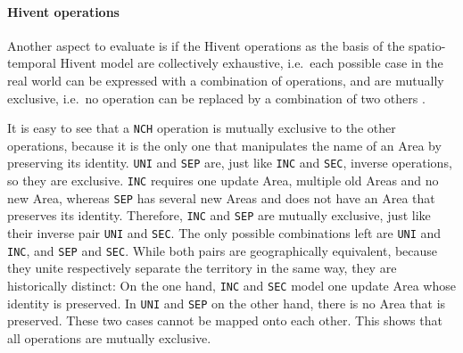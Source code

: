 
\paragraph{Hivent operations} %
\label{par:hivent_operations}

Another aspect to evaluate is if the Hivent operations as the basis of the spatio-temporal Hivent model are collectively exhaustive, i.e.\ each possible case in the real world can be expressed with a combination of operations, and are mutually exclusive, i.e.\ no operation can be replaced by a combination of two others \cite{mece}.

It is easy to see that a \texttt{NCH} operation is mutually exclusive to the other operations, because it is the only one that manipulates the name of an Area by preserving its identity. \texttt{UNI} and \texttt{SEP} are, just like \texttt{INC} and \texttt{SEC}, inverse operations, so they are exclusive. \texttt{INC} requires one update Area, multiple old Areas and no new Area, whereas \texttt{SEP} has several new Areas and does not have an Area that preserves its identity. Therefore, \texttt{INC} and \texttt{SEP} are mutually exclusive, just like their inverse pair \texttt{UNI} and \texttt{SEC}.
The only possible combinations left are \texttt{UNI} and \texttt{INC}, and \texttt{SEP} and \texttt{SEC}. While both pairs are geographically equivalent, because they unite respectively separate the territory in the same way, they are historically distinct: On the one hand, \texttt{INC} and \texttt{SEC} model one update Area whose identity is preserved. In \texttt{UNI} and \texttt{SEP} on the other hand, there is no Area that is preserved. These two cases cannot be mapped onto each other. This shows that all operations are mutually exclusive.


